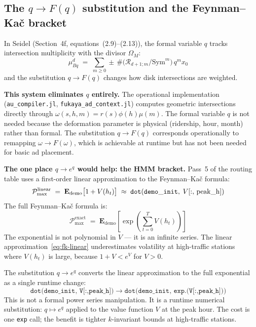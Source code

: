 \documentclass[11pt]{amsart}
\theoremstyle{definition}
\begin{document}
\subsection{The $q \to F(q)$ substitution and the Feynman--Ka\v{c} bracket}
\label{sec:fk-substitution}

In Seidel \cite{Seidel23} (Section~4f, equations~(2.9)--(2.13)),
the formal variable $q$ tracks intersection multiplicity with the
divisor $\Omega_M$:
\[
  \mu^d_{Bq} \;=\; \sum_{m\geq 0} \pm\,\#\bigl(\mathcal{R}_{d+1;m}/\mathrm{Sym}^m\bigr)\,
  q^m x_0
\]
and the substitution $q \to F(q)$ changes how disk intersections are weighted.

\textbf{This system eliminates $q$ entirely.}
The operational implementation (\texttt{au\_compiler.jl},
\texttt{fukaya\_ad\_context.jl}) computes geometric intersections
directly through $\omega(s,h,m) = r(s)\phi(h)\mu(m)$.
The formal variable $q$ is not needed because the deformation parameter
is physical (ridership, hour, month) rather than formal.
The substitution $q \to F(q)$ corresponds operationally to remapping
$\omega \to F(\omega)$, which is achievable at runtime but has not
been needed for basic ad placement.

\textbf{The one place $q \to e^q$ would help: the HMM bracket.}
Pass~5 of the routing table uses a first-order linear approximation
to the Feynman--Ka\v{c} formula:
\begin{equation}
  \label{eq:fk-linear}
  \mathcal{P}_{\max}^{\mathrm{linear}}
  \;=\; \mathbf{E}_{\mathrm{demo}}\bigl[1 + V(h_t)\bigr]
  \;\approx\; \mathtt{dot}({\tt demo\_init},\; V[:,\, \mathrm{peak\_h}])
\end{equation}
The full Feynman--Ka\v{c} formula is:
\begin{equation}
  \label{eq:fk-full}
  \mathcal{P}_{\max}^{\mathrm{exact}}
  \;=\; \mathbf{E}_{\mathrm{demo}}\!\left[\exp\!\left(\sum_{t=0}^T V(h_t)\right)\right]
\end{equation}
The exponential is not polynomial in $V$ --- it is an infinite series.
The linear approximation~\eqref{eq:fk-linear} underestimates volatility
at high-traffic stations where $V(h_t)$ is large, because
$1 + V < e^V$ for $V > 0$.

The substitution $q \to e^q$ converts the linear approximation to
the full exponential as a single runtime change:
\begin{equation}
  \label{eq:fk-substitution}
  \texttt{dot(demo\_init, V[:,peak\_h])}
  \;\longrightarrow\;
  \texttt{dot(demo\_init, exp.(V[:,peak\_h]))}
\end{equation}
This is not a formal power series manipulation.
It is a runtime numerical substitution: $q \mapsto e^q$ applied to
the value function $V$ at the peak hour.
The cost is one \texttt{exp} call; the benefit is tighter
$k$-invariant bounds at high-traffic stations.
\end{document}
